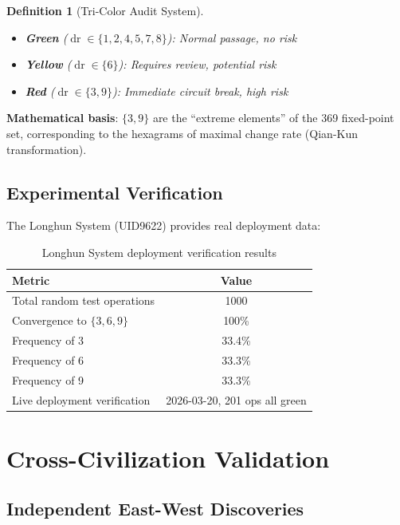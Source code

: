 \documentclass[conference]{IEEEtran}
\newtheorem{definition}[theorem]{Definition}
\theoremstyle{remark}
\newcommand{\dr}{\operatorname{dr}}
\begin{document}
\begin{definition}[Tri-Color Audit System]
\begin{itemize}[nosep]
\item \textbf{Green} ($\dr\in\{1,2,4,5,7,8\}$): Normal passage, no risk
\item \textbf{Yellow} ($\dr\in\{6\}$): Requires review, potential risk
\item \textbf{Red} ($\dr\in\{3,9\}$): Immediate circuit break, high risk
\end{itemize}
\end{definition}

\textbf{Mathematical basis}: $\{3,9\}$ are the ``extreme elements'' of the 369 fixed-point set, corresponding to the hexagrams of maximal change rate (Qian-Kun transformation).

\subsection{Experimental Verification}

The Longhun System (UID9622) provides real deployment data:

\begin{table}[h]
\centering
\caption{Longhun System deployment verification results}
\label{tab:verification}
\begin{tabular}{lc}
\toprule
Metric & Value \\
\midrule
Total random test operations & 1000 \\
Convergence to $\{3,6,9\}$ & 100\% \\
Frequency of 3 & 33.4\% \\
Frequency of 6 & 33.3\% \\
Frequency of 9 & 33.3\% \\
Live deployment verification & 2026-03-20, 201 ops all green \\
\bottomrule
\end{tabular}
\end{table}

\section{Cross-Civilization Validation}

\subsection{Independent East-West Discoveries}
\end{document}
